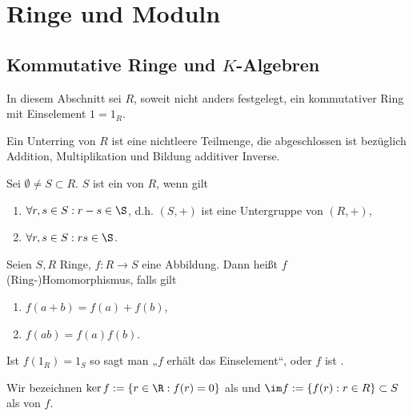 \chapter{Ringe und Moduln}




\section{Kommutative Ringe und $K$-Algebren}

\begin{conv}
	In diesem Abschnitt sei $R$, soweit nicht anders festgelegt, ein kommutativer Ring mit Einselement $1 = 1_R$.
\end{conv}

Ein Unterring von $R$ ist eine nichtleere Teilmenge, die abgeschlossen ist bezüglich Addition, Multiplikation und Bildung additiver Inverse.

\begin{df}[Unterring]
	Sei $\emptyset \neq S \subset R$.
	$S$ ist ein  von $R$, wenn gilt
	\begin{enumerate}[1.]
		\item
			$\forall r,s \in S : r - s \in \S$, d.h. $(S, +)$ ist eine Untergruppe von $(R, +)$,
		\item
			$\forall r,s \in S : rs \in \S$.
	\end{enumerate}
\end{df}

\begin{df}[Ringhomomorphismus]
	Seien $S, R$ Ringe, $f: R \to S$ eine Abbildung.
	Dann heißt $f$ (Ring-)Homomorphismus, falls gilt
	\begin{enumerate}[1.]
		\item
			$f(a + b) = f(a) + f(b)$,
		\item
			$f(ab) = f(a)f(b)$.
	\end{enumerate}
	Ist $f(1_R) = 1_S$ so sagt man „$f$ erhält das Einselement“, oder $f$ ist .

	Wir bezeichnen $\ker f := \{r \in \R : f(r) = 0\}$ als  und $\im f := \{ f(r) : r \in R \} \subset S$ als  von $f$.

\end{df}


